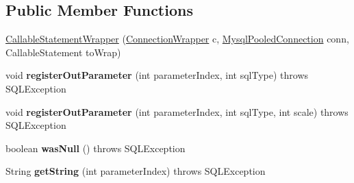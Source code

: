 \subsection*{Public Member Functions}
\begin{DoxyCompactItemize}
\item 
\mbox{\hyperlink{classcom_1_1mysql_1_1jdbc_1_1jdbc2_1_1optional_1_1_callable_statement_wrapper_a1916f1cb5146f710443735935dada818}{Callable\+Statement\+Wrapper}} (\mbox{\hyperlink{classcom_1_1mysql_1_1jdbc_1_1jdbc2_1_1optional_1_1_connection_wrapper}{Connection\+Wrapper}} c, \mbox{\hyperlink{classcom_1_1mysql_1_1jdbc_1_1jdbc2_1_1optional_1_1_mysql_pooled_connection}{Mysql\+Pooled\+Connection}} conn, Callable\+Statement to\+Wrap)
\item 
\mbox{\label{classcom_1_1mysql_1_1jdbc_1_1jdbc2_1_1optional_1_1_callable_statement_wrapper_a4d01c0454d0cb31fa8560e6d4e8083e1}} 
void {\bfseries register\+Out\+Parameter} (int parameter\+Index, int sql\+Type)  throws S\+Q\+L\+Exception 
\item 
\mbox{\label{classcom_1_1mysql_1_1jdbc_1_1jdbc2_1_1optional_1_1_callable_statement_wrapper_ab28f89aa7050824d3a7fd100a0d181d8}} 
void {\bfseries register\+Out\+Parameter} (int parameter\+Index, int sql\+Type, int scale)  throws S\+Q\+L\+Exception 
\item 
\mbox{\label{classcom_1_1mysql_1_1jdbc_1_1jdbc2_1_1optional_1_1_callable_statement_wrapper_a4e715c742517abb0117eb9b24c9f600a}} 
boolean {\bfseries was\+Null} ()  throws S\+Q\+L\+Exception 
\item 
\mbox{\label{classcom_1_1mysql_1_1jdbc_1_1jdbc2_1_1optional_1_1_callable_statement_wrapper_a6171402bfd881e4bab99b6e56a33da2b}} 
String {\bfseries get\+String} (int parameter\+Index)  throws S\+Q\+L\+Exception 
\item 
\mbox{\label{classcom_1_1mysql_1_1jdbc_1_1jdbc2_1_1optional_1_1_callable_statement_wrapper_a848c117acaf89c23fb325c4b197fd75b}} 

\end{DoxyCompactItemize}
